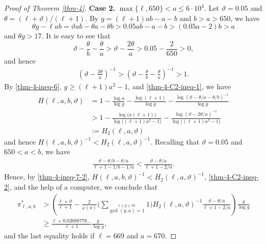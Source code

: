 \documentclass[12pt,a4paper,reqno]{amsart}
\numberwithin{equation}{section}
\theoremstyle{plain}
\theoremstyle{definition}
\begin{document}
\begin{proof}[Proof of Theorem \ref{thm-4}]
\textbf{Case 2.} $\max\{\ell,650\}<a\leq 6\cdot 10^{4}$. Let $\vartheta=0.05 $ and $\theta = (\ell+\vartheta)/(\ell+1)$. By $g=(\ell+1)ab-a-b$ and $b>a>650$, we have 
$$
\theta g-\ell ab 
= \vartheta ab-\theta a-\theta b
> 0.05ab-a-b
> (0.05a-2)b
> a
$$
and $\theta g>17$.
It is easy to see that 
\begin{equation*}
	\vartheta-\frac{\theta}{b}-\frac{\theta}{a}
	>\vartheta-\frac{2\theta}{a}
	>0.05 -\frac{2}{650}
	>0,
\end{equation*}
and hence 
\begin{align}\label{thm-4-C2-ineq-1}
	\left(\vartheta-\frac{2\theta}{a}\right)^{-1}
	>\left(\vartheta-\frac{\theta}{b}-\frac{\theta}{a}\right)^{-1}>1.
\end{align}
By \eqref{thm-4-ineq-6}, $g\geq (\ell+1)a^{2}-1$, and \eqref{thm-4-C2-ineq-1}, we have 
\begin{align*}
		H(\ell,a,b,\vartheta)
	&= 1-\frac{\log a}{\log  g}-\frac{\log(\ell+1)}{\log g}-\frac{\log( \vartheta-\theta/a-\theta/b)^{-1}}{\log  g}\nonumber\\
	&> 1-\frac{\log\big( a(\ell+1) \big)}{\log\big( (\ell+1)a^{2}-1 \big)}-\frac{\log(\vartheta -2\theta/a)^{-1}}{\log \big( (\ell+1)a^{2}-1\big)}
	\nonumber\\
	&:= H_{2}(\ell,a,\vartheta)
\end{align*}
and hence $H(\ell,a,b,\vartheta)^{-1}< H_{2}(\ell,a,\vartheta)^{-1}$.
Recalling that $\vartheta=0.05$ and $650<a<b$, we have
\begin{align}\label{thm-4-C2-ineq-2}
	\frac{\vartheta-\theta/b-\theta/a}{\ell+1-1/b-1/a}
	<
	\frac{\vartheta-\theta/a}{\ell+1-2/a}.
\end{align}
Hence, by \eqref{thm-4-ineq-7-2}, $H(\ell,a,b,\vartheta)^{-1}<H_{2}(\ell,a,\vartheta)^{-1}$, \eqref{thm-4-C2-ineq-2}, and the help of a computer, we conclude that
\begin{align*}
	\pi^{*}_{\ell,a,b} 
	&>\left( 
		\frac{\ell+\vartheta}{\ell+1}
		-\frac{2}{\varphi(a)}
		\Bigg(
			\sum_{\stackrel{1\leq y\leq \vartheta a}{
				\gcd(y,a)=1}} 1
		\Bigg)
			H_{2}(\ell,a,\vartheta)^{-1}
		\frac{\vartheta-\theta/a}{\ell+1-2/a}
	\right)  \frac{g}{\log g}\\
	&\geq \frac{\ell+0.02088778\ldots}{\ell+1}\frac{g}{\log g},
\end{align*}
and the last equality holds if $\ell=669$ and $a = 670$.


\end{proof}
\end{document}
